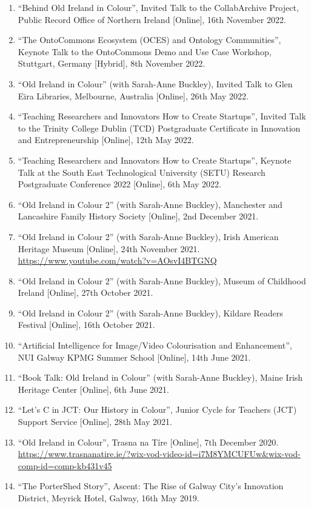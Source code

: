 \documentclass[10pt,a4paper]{res} %
\begin{document}
\begin{resume}
\begin{enumerate}
\item ``Behind Old Ireland in Colour'', Invited Talk to the CollabArchive Project, Public Record Office of Northern Ireland [Online], 16th November 2022.
\item ``The OntoCommons Ecosystem (OCES) and Ontology Communities'', Keynote Talk to the OntoCommons Demo and Use Case Workshop, Stuttgart, Germany [Hybrid], 8th November 2022.
\item ``Old Ireland in Colour'' (with Sarah-Anne Buckley), Invited Talk to Glen Eira Libraries, Melbourne, Australia [Online], 26th May 2022.
\item ``Teaching Researchers and Innovators How to Create Startups'', Invited Talk to the Trinity College Dublin (TCD) Postgraduate Certificate in Innovation and Entrepreneurship [Online], 12th May 2022.
\item ``Teaching Researchers and Innovators How to Create Startups'', Keynote Talk at the South East Technological University (SETU) Research Postgraduate Conference 2022 [Online], 6th May 2022.
\item ``Old Ireland in Colour 2'' (with Sarah-Anne Buckley), Manchester and Lancashire Family History Society [Online], 2nd December 2021.
\item ``Old Ireland in Colour 2'' (with Sarah-Anne Buckley), Irish American Heritage Museum [Online], 24th November 2021. \url{https://www.youtube.com/watch?v=AOsvI4BTGNQ}
\item ``Old Ireland in Colour 2'' (with Sarah-Anne Buckley), Museum of Childhood Ireland [Online], 27th October 2021.
\item ``Old Ireland in Colour 2'' (with Sarah-Anne Buckley), Kildare Readers Festival [Online], 16th October 2021.
\item ``Artificial Intelligence for Image/Video Colourisation and Enhancement'', NUI Galway KPMG Summer School [Online], 14th June 2021.
\item ``Book Talk: Old Ireland in Colour'' (with Sarah-Anne Buckley), Maine Irish Heritage Center [Online], 6th June 2021.
\item ``Let's C in JCT: Our History in Colour'', Junior Cycle for Teachers (JCT) Support Service [Online], 28th May 2021.
\item ``Old Ireland in Colour'', Trasna na T\'{i}re [Online], 7th December 2020. \url{https://www.trasnanatire.ie/?wix-vod-video-id=i7M8YMCUFUw&wix-vod-comp-id=comp-kb431v45}
\item ``The PorterShed Story'', Ascent: The Rise of Galway City's Innovation District, Meyrick Hotel, Galway, 16th May 2019.

\end{enumerate}
\end{resume}
\end{document}
